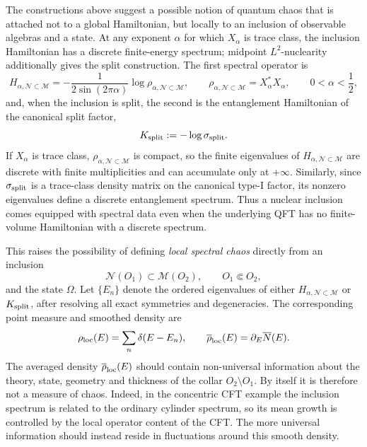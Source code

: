 \documentclass[a4paper,11pt]{article}
\theoremstyle{definition}
\newcommand{\mN}{\mathcal{N}}
\newcommand{\mM}{\mathcal{M}}
\begin{document}
The constructions above suggest a possible notion of quantum chaos that is attached not to a global Hamiltonian, but locally to an inclusion of observable algebras and a state. At any exponent $\alpha$ for which $X_\alpha$ is trace class, the inclusion Hamiltonian has a discrete finite-energy spectrum; midpoint $L^2$-nuclearity additionally gives the split construction. The first spectral operator is
\begin{equation}
    H_{\alpha,\mN\subset\mM}
    =
    -\frac{1}{2\sin(2\pi\alpha)}
    \log\rho_{\alpha,\mN\subset\mM},
    \qquad
    \rho_{\alpha,\mN\subset\mM}=X_\alpha^*X_\alpha,
    \qquad
    0<\alpha<\frac12 ,
    \label{eq:local-chaos-Halpha}
\end{equation}
and, when the inclusion is split, the second is the entanglement Hamiltonian of the canonical split factor,
\begin{equation}
    K_{\rm split}:=-\log\sigma_{\rm split}.
    \label{eq:local-chaos-Ksplit}
\end{equation}
If $X_\alpha$ is trace class, $\rho_{\alpha,\mN\subset\mM}$ is compact, so the finite eigenvalues of $H_{\alpha,\mN\subset\mM}$ are discrete with finite multiplicities and can accumulate only at $+\infty$.  Similarly, since $\sigma_{\rm split}$ is a trace-class density matrix on the canonical type-I factor, its nonzero eigenvalues define a discrete entanglement spectrum.  Thus a nuclear inclusion comes equipped with spectral data even when the underlying QFT has no finite-volume Hamiltonian with a discrete spectrum.

This raises the possibility of defining \emph{local spectral chaos} directly from an inclusion
\begin{equation}
    \mN(O_1)\subset\mM(O_2),
    \qquad O_1\Subset O_2,
\end{equation}
and the state $\Omega$.  Let $\{E_n\}$ denote the ordered eigenvalues of either
$H_{\alpha,\mN\subset\mM}$ or $K_{\rm split}$, after resolving all exact symmetries and degeneracies.  The corresponding point measure and smoothed density are
\begin{equation}
    \rho_{\rm loc}(E)
    =
    \sum_n\delta(E-E_n),
    \qquad
    \overline\rho_{\rm loc}(E)
    =
    \partial_E\overline N(E).
    \label{eq:local-density-states}
\end{equation}
The averaged density $\overline\rho_{\rm loc}(E)$ should contain non-universal information about the theory, state, geometry and thickness of the collar $O_2\setminus O_1$.  By itself it is therefore not a measure of chaos.  Indeed, in the concentric CFT example the inclusion spectrum is related to the ordinary cylinder spectrum, so its mean growth is controlled by the local operator content of the CFT.  The more universal information should instead reside in fluctuations around this smooth density.
\end{document}
